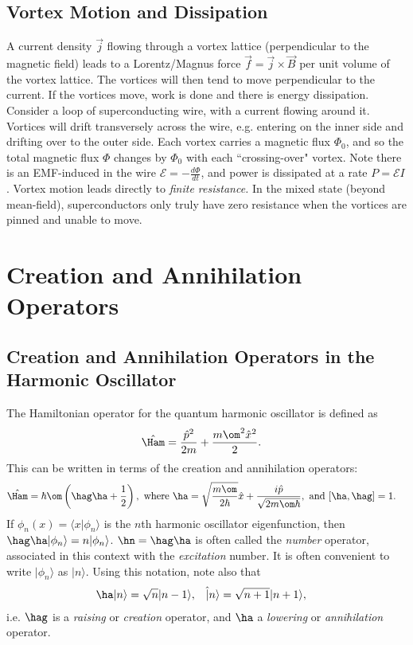\documentclass[qo.tex]{subfiles}
\begin{document}
\section{Vortex Motion and Dissipation}
A current density $\vec{j}$ flowing through a vortex lattice (perpendicular to the magnetic field) leads to a Lorentz/Magnus force $\vec{f}=\vec{j}\times\vec{B}$ per unit volume of the vortex lattice.
The vortices will then tend to move perpendicular to the current. 
If the vortices move, work is done and there is energy dissipation. 
Consider a loop of superconducting wire, with a current flowing around it. 
Vortices will drift transversely across the wire, e.g. entering on the inner side and drifting over to the outer side. 
Each vortex carries a magnetic flux $\Phi_0$, and so the total magnetic flux $\Phi$ changes by $\Phi_0$ with each ``crossing-over" vortex.
Note there is an EMF-induced in the wire $\mathcal{E}=-\frac{d\Phi}{dt}$, and power is dissipated at a rate $P=\mathcal{E}I$.
Vortex motion leads directly to \emph{finite resistance.}
In the mixed state (beyond mean-field), superconductors only truly have zero resistance when the vortices are pinned and unable to move.

\chapter{Creation and Annihilation Operators}
\section{Creation and Annihilation Operators in the Harmonic Oscillator}
The Hamiltonian operator for the quantum harmonic oscillator is defined as
\begin{align}
    \hat{\Ham} &= \frac{\hat{p}^2}{2m} + \frac{m\om^2\hat{x}^2}{2}.
\end{align}
This can be written in terms of the creation and annihilation operators:
\begin{align}
    \hat{\Ham} &= \hbar\om\left(\hag\ha+\frac12\right), \text{ where } \ha = \sqrt{\frac{m\om}{2\hbar}}\hat{x} + \frac{i\hat{p}}{\sqrt{2m\om\hbar}}, \text{ and } [\ha,\hag] = 1.
\end{align}
If $\phi_n(x)=\langle x|\phi_n\rangle$ is the $n$th harmonic oscillator eigenfunction, then $\hag\ha|\phi_n\rangle=n|\phi_n\rangle$.
$\hn=\hag\ha$ is often called the \emph{number} operator, associated in this context with the \emph{excitation} number. 
It is often convenient to write $|\phi_n\rangle$ as $|n\rangle$.
Using this notation, note also that
\begin{align}
    \ha|n\rangle &= \sqrt{n}|n-1\rangle, & \hat|n\rangle &= \sqrt{n+1}|n+1\rangle,
\end{align}
i.e. $\hag$ is a \emph{raising} or \emph{creation} operator, and $\ha$ a \emph{lowering} or \emph{annihilation} operator.
\end{document}
